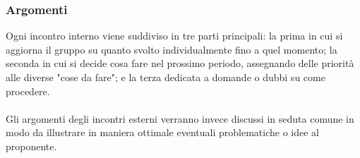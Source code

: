 \subsubsection{Argomenti}
Ogni incontro interno viene suddiviso in tre parti principali: la prima in cui si aggiorna il gruppo su quanto svolto individualmente fino a quel momento; la seconda in cui si decide cosa fare nel prossimo periodo, assegnando delle priorità alle diverse "cose da fare"; e la terza dedicata a domande o dubbi su come procedere.
\\ \\
Gli argomenti degli incontri esterni verranno invece discussi in seduta comune in modo da illustrare in maniera ottimale eventuali problematiche o idee al proponente.